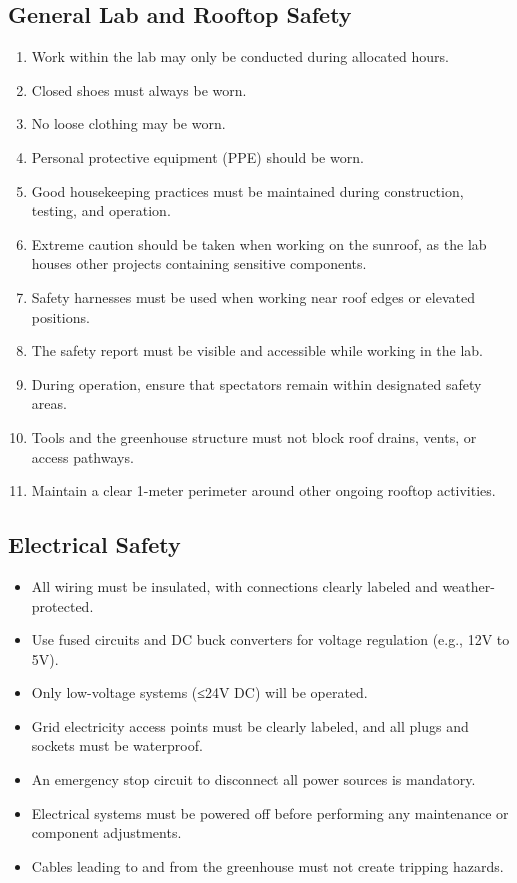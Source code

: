 \subsection{General Lab and Rooftop Safety}
\begin{enumerate}
	\item Work within the lab may only be conducted during allocated hours.
	\item Closed shoes must always be worn.
	\item No loose clothing may be worn.
	\item Personal protective equipment (PPE) should be worn.
	\item Good housekeeping practices must be maintained during construction, testing, and operation.
	\item Extreme caution should be taken when working on the sunroof, as the lab houses other projects containing sensitive components.
	\item Safety harnesses must be used when working near roof edges or elevated positions.
	\item The safety report must be visible and accessible while working in the lab.
	\item During operation, ensure that spectators remain within designated safety areas.
	\item Tools and the greenhouse structure must not block roof drains, vents, or access pathways.
	\item Maintain a clear 1-meter perimeter around other ongoing rooftop activities.
\end{enumerate}

\subsection{Electrical Safety}
\begin{itemize}
	\item All wiring must be insulated, with connections clearly labeled and weather-protected.
	\item Use fused circuits and DC buck converters for voltage regulation (e.g., 12V to 5V).
	\item Only low-voltage systems (≤24V DC) will be operated.
	\item Grid electricity access points must be clearly labeled, and all plugs and sockets must be waterproof.
	\item An emergency stop circuit to disconnect all power sources is mandatory.
	\item Electrical systems must be powered off before performing any maintenance or component adjustments.
	\item Cables leading to and from the greenhouse must not create tripping hazards.
\end{itemize}

